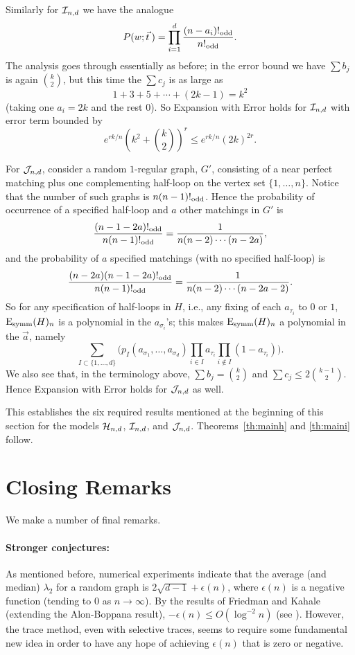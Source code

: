 \documentclass[12pt]{article}
\newcommand{\ch}{{\cal H}}
\newcommand{\ci}{{\cal I}}
\newcommand{\cj}{{\cal J}}
\newcommand{\cjnd}{\cj_{n,d}}
\newcommand{\cind}{\ci_{n,d}}
\newcommand{\chnd}{\ch_{n,d}}
\newcommand{\oddf}{!_{\rm odd}}
\newcommand{\Esymm}{{\rm E}_{\rm symm}}
\newcommand{\intn}{{\{1,\ldots,n\}}}
\begin{document}
Similarly for $\cind$ we have the analogue
$$
P(w;\vec t\>) = \prod_{i=1}^{d} \frac{(n-a_i)\oddf}{n\oddf}.
$$
The analysis goes through essentially as before; in the error bound
we have $\sum b_j$ is again $\binom{k}{2}$, but this time the
$\sum c_j$ is as large as
$$
1+3+5+\cdots+(2k-1) = k^2
$$
(taking one $a_i=2k$ and the rest $0$).
So Expansion with Error holds for $\cind$ with
error term bounded by
$$
e^{rk/n}\left(k^2+\binom{k}{2}\right)^{r}\le
e^{rk/n}(2k)^{2r}.
$$


For $\cjnd$, consider a random $1$-regular graph, $G'$, consisting of a near
perfect matching plus one complementing half-loop on the vertex set
$\intn$.  Notice that the
number of such graphs is $n(n-1)\oddf$.  Hence the probability of
occurrence of a specified half-loop and $a$ other matchings in $G'$ is
$$
\frac{(n-1-2a)\oddf}{n(n-1)\oddf} = \frac{1}{n(n-2)\cdots(n-2a)},
$$
and the probability of $a$ specified matchings (with no specified half-loop)
is
$$
\frac{(n-2a)(n-1-2a)\oddf}{n(n-1)\oddf} = \frac{1}{n(n-2)\cdots(n-2a-2)}.
$$
So for any specification of half-loops in $H$, i.e., any fixing of each
$a_{\tau_i}$ to $0$ or $1$,
$\Esymm(H)_n$ is a polynomial in the $a_{\sigma_i}$'s; this makes 
$\Esymm(H)_n$ a polynomial
in the $\vec a$, namely
$$
\sum_{I\subset\{1,\ldots,d\}} \biggl(p_I(a_{\sigma_1},\ldots,a_{\sigma_d})
\prod_{i\in I} a_{\tau_i}
\prod_{i\notin I} (1-a_{\tau_i})\biggr).
$$
We also see that, in the terminology above, $\sum b_j = \binom{k}{2}$ 
and $\sum c_j \le 2\binom{k-1}{2}$.  Hence Expansion with Error holds
for $\cjnd$ as well.

This establishes the six required results mentioned at the beginning of
this section for the models $\chnd$, $\cind$, and $\cjnd$.
Theorems~\ref{th:mainh} and \ref{th:maini} follow.


\section{Closing Remarks}

We make a number of final remarks.

\paragraph{Stronger conjectures:}
As mentioned before, numerical experiments indicate that the average
(and median) $\lambda_2$ for a random graph is $2\sqrt{d-1}+\epsilon(n)$,
where $\epsilon(n)$ is a negative function (tending to $0$ as $n\to\infty$).
By the results of Friedman and Kahale (extending the Alon-Boppana result),
$-\epsilon(n)\le O(\log^{-2}n)$ (see \cite{friedman_geometric_aspects}).
However, the trace method, even with selective traces, seems to require
some fundamental new idea in order to have any hope of achieving
$\epsilon(n)$ that is zero or negative.
\end{document}
